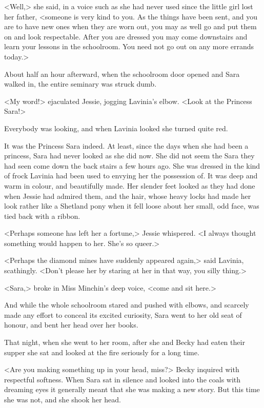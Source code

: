 <Well,> she said, in a voice such as she had never used since the little girl lost her father, <someone is very kind to you. As the things have been sent, and you are to have new ones when they are worn out, you may as well go and put them on and look respectable. After you are dressed you may come downstairs and learn your lessons in the schoolroom. You need not go out on any more errands today.>

About half an hour afterward, when the schoolroom door opened and Sara walked in, the entire seminary was struck dumb.

<My word!> ejaculated Jessie, jogging Lavinia's elbow. <Look at the Princess Sara!>

Everybody was looking, and when Lavinia looked she turned quite red.

It was the Princess Sara indeed. At least, since the days when she had been a princess, Sara had never looked as she did now. She did not seem the Sara they had seen come down the back stairs a few hours ago. She was dressed in the kind of frock Lavinia had been used to envying her the possession of. It was deep and warm in colour, and beautifully made. Her slender feet looked as they had done when Jessie had admired them, and the hair, whose heavy locks had made her look rather like a Shetland pony when it fell loose about her small, odd face, was tied back with a ribbon.

<Perhaps someone has left her a fortune,> Jessie whispered. <I always thought something would happen to her. She's so queer.>

<Perhaps the diamond mines have suddenly appeared again,> said Lavinia, scathingly. <Don't please her by staring at her in that way, you silly thing.>

<Sara,> broke in Miss Minchin's deep voice, <come and sit here.>

And while the whole schoolroom stared and pushed with elbows, and scarcely made any effort to conceal its excited curiosity, Sara went to her old seat of honour, and bent her head over her books.

That night, when she went to her room, after she and Becky had eaten their supper she sat and looked at the fire seriously for a long time.

<Are you making something up in your head, miss?> Becky inquired with respectful softness. When Sara sat in silence and looked into the coals with dreaming eyes it generally meant that she was making a new story. But this time she was not, and she shook her head.

